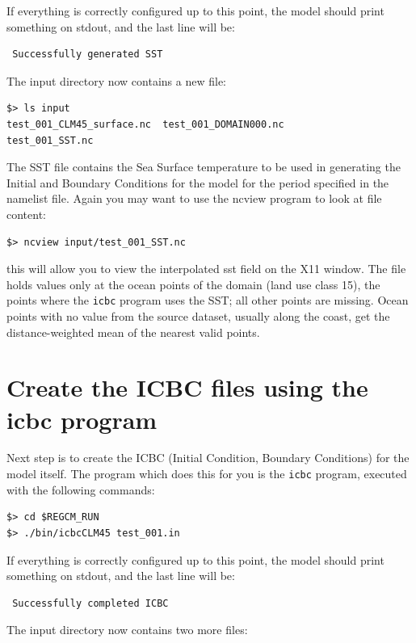If everything is correctly configured up to this point, the model should print
something on stdout, and the last line will be:

\begin{Verbatim}
 Successfully generated SST
\end{Verbatim}

The input directory now contains a new file:

\begin{Verbatim}
$> ls input
test_001_CLM45_surface.nc  test_001_DOMAIN000.nc
test_001_SST.nc
\end{Verbatim}

The SST file contains the Sea Surface temperature to be used in generating the
Initial and Boundary Conditions for the model for the period specified in the
namelist file. Again you may want to use the ncview program to look at
file content:

\begin{Verbatim}
$> ncview input/test_001_SST.nc
\end{Verbatim}

this will allow you to view the interpolated sst field on the X11 window.
The file holds values only at the ocean points of the domain (land use
class 15), the points where the \verb=icbc= program uses the SST; all other
points are missing. Ocean points with no value from the source dataset,
usually along the coast, get the distance-weighted mean of the nearest
valid points.

\section{Create the ICBC files using the icbc program}

Next step is to create the ICBC (Initial Condition, Boundary Conditions) for
the model itself. The program which does this for you is the \verb=icbc=
program, executed with the following commands:

\begin{Verbatim}
$> cd $REGCM_RUN
$> ./bin/icbcCLM45 test_001.in
\end{Verbatim}

If everything is correctly configured up to this point, the model should print
something on stdout, and the last line will be:

\begin{Verbatim}
 Successfully completed ICBC
\end{Verbatim}

The input directory now contains two more files:

